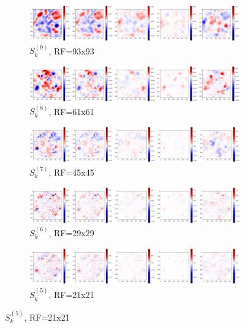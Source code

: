 \documentclass[preprint]{elsarticle}
\theoremstyle{definition} %
\theoremstyle{remark}
\begin{document}
\begin{figure}[h!]
	\centering
	\begin{subfigure}[b]{\textwidth}
		\includegraphics[width=\textwidth]{figures/score-prop-23713_left/score_k93.png}
		\caption{$S_k^{(9)}$, RF=93x93}
		\label{fig:score_k93}
	\end{subfigure}	
	\begin{subfigure}[b]{\textwidth}
		\includegraphics[width=\textwidth]{figures/score-prop-23713_left/score_k61.png}
		\caption{$S_k^{(8)}$, RF=61x61}
		\label{fig:score_k61}
	\end{subfigure}
	
	\begin{subfigure}[b]{\textwidth}
		\includegraphics[width=\textwidth]{figures/score-prop-23713_left/score_k45.png}
		\caption{$S_k^{(7)}$, RF=45x45}
		\label{fig:score_k45}
	\end{subfigure}
	
	\begin{subfigure}[b]{\textwidth}
		\includegraphics[width=\textwidth]{figures/score-prop-23713_left/score_k29.png}
		\caption{$S_k^{(6)}$, RF=29x29}
		\label{fig:score_k29}
	\end{subfigure}
	
	\begin{subfigure}[b]{\textwidth}
		\includegraphics[width=\textwidth]{figures/score-prop-23713_left/score_k21.png}
		\caption{$S_k^{(5)}$, RF=21x21}
		\label{fig:score_k21}
	\end{subfigure}
	

\end{figure}
\end{document}

